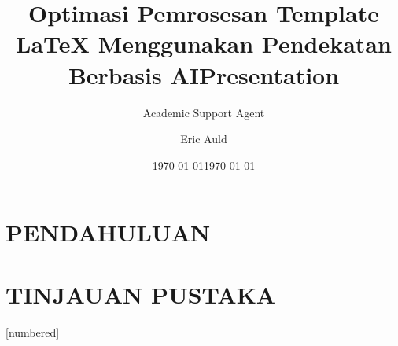 \documentclass{beamer}
\title{Optimasi Pemrosesan Template LaTeX Menggunakan Pendekatan Berbasis AI}
\author{Academic Support Agent}
\date{\today}
\begin{document}
\maketitle

\begin{abstract}

\end{abstract}

\chapter{PENDAHULUAN}


\chapter{TINJAUAN PUSTAKA}



{
  [numbered]
} 

\usepackage[english]{babel}
\usepackage[utf8x]{inputenc}

\title[presentationTemplate]{Presentation}
\author{Eric Auld}
\date{\today}

\usepackage{amsthm, amssymb, amsfonts, amsmath}
\usepackage{graphicx}
\usepackage{tikz}
\usetikzlibrary{calc,shapes}
\usepackage{mathtools}
\usepackage{mathrsfs}
\usepackage{tikz-cd}

\newcommand{\C}{\mathbb{C}}
\newcommand{\R}{\mathbb{R}}
\newcommand{\Q}{\mathbb{Q}}
\newcommand{\Z}{\mathbb{Z}}
\newcommand{\N}{\mathbb{N}}
\newcommand{\p}{\mathbb{P}}
\newcommand{\E}{\mathbb{E}}
\end{document}
